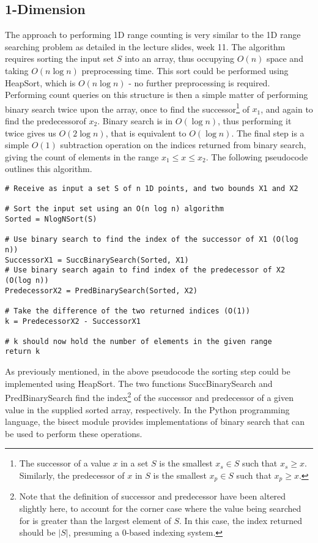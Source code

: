 \documentclass[paper=a4, fontsize=12pt]{article}
\begin{document}
\subsection{1-Dimension}
\label{subsec:1drangecount}

The approach to performing 1D range counting is very similar to the 1D range
searching problem as detailed in the lecture slides, week 11. The algorithm
requires sorting the input set \(S\) into an array, thus occupying \(O(n)\)
space and taking \(O(n \log n)\) preprocessing time. This sort could be
performed using HeapSort, which is \(O(n \log n)\) - no further preprocessing
is required. Performing count queries on this structure is then a simple matter
of performing binary search twice upon the array, once to find the
successor\footnote{The successor of a value \(x\) in a set \(S\) is the
 smallest \(x_s \in S\) such that \(x_s \geq x\). Similarly, the predecessor
 of \(x\) in \(S\) is the smallest \(x_p \in S\) such that \(x_p \geq x\).} of
\(x_1\), and again to find the predecessor\footnotemark[\value{footnote}] of
\(x_2\). Binary search is in \(O(\log n)\), thus performing it twice gives us
\(O(2 \log n)\), that is equivalent to \(O(\log n)\). The final step is a
simple \(O(1)\) subtraction operation on the indices returned from binary
search, giving the count of elements in the range \(x_1 \leq x \leq x_2\). The
following pseudocode outlines this algorithm.

\begin{lstlisting}
# Receive as input a set S of n 1D points, and two bounds X1 and X2

# Sort the input set using an O(n log n) algorithm
Sorted = NlogNSort(S)

# Use binary search to find the index of the successor of X1 (O(log n))
SuccessorX1 = SuccBinarySearch(Sorted, X1)
# Use binary search again to find index of the predecessor of X2 (O(log n))
PredecessorX2 = PredBinarySearch(Sorted, X2)

# Take the difference of the two returned indices (O(1))
k = PredecessorX2 - SuccessorX1

# k should now hold the number of elements in the given range
return k
\end{lstlisting}

As previously mentioned, in the above pseudocode the sorting step could be
implemented using HeapSort. The two functions SuccBinarySearch and
PredBinarySearch find the index\footnote{Note that the definition of successor
 and predecessor have been altered slightly here, to account for the corner
 case where the value being searched for is greater than the largest element
 of \(S\). In this case, the index returned should be \(|S|\), presuming a
 0-based indexing system.} of the successor and predecessor of a given value
in the supplied sorted array, respectively. In the Python programming language,
the bisect module provides implementations of binary search that can be used to
perform these operations.
\end{document}
